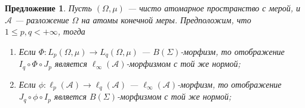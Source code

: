 \documentclass[12pt]{article}
\newtheorem{proposition}[theorem]{Предложение}
\begin{document}
\begin{proposition}\label{SwtchMorphBtwnAtomMeasSp}
    Пусть $(\Omega,\mu)$ --- чисто атомарное пространство с мерой, 
    и $\mathcal{A}$ --- разложение $\Omega$ на атомы конечной меры. 
    Предположим, что $1\leq p,q<+\infty$, тогда
    \begin{enumerate}[label = (\roman*)]
        \item Если $\Phi:L_p(\Omega,\mu)\to L_q(\Omega,\mu)$ --- 
        $B(\Sigma)$-морфизм, то отображение $I_q\circ \Phi\circ J_p$ 
        является $\ell_\infty(\mathcal{A})$-морфизмом с той же нормой;

        \item Если $\phi:\ell_p(\mathcal{A})\to \ell_q(\mathcal{A})$ --- 
        $\ell_\infty(\mathcal{A})$-морфизм, то 
        отображение $J_q\circ \phi\circ I_p$ является 
        $B(\Sigma)$-морфизмом с той же нормой;
    \end{enumerate} 
\end{proposition}
\end{document}
